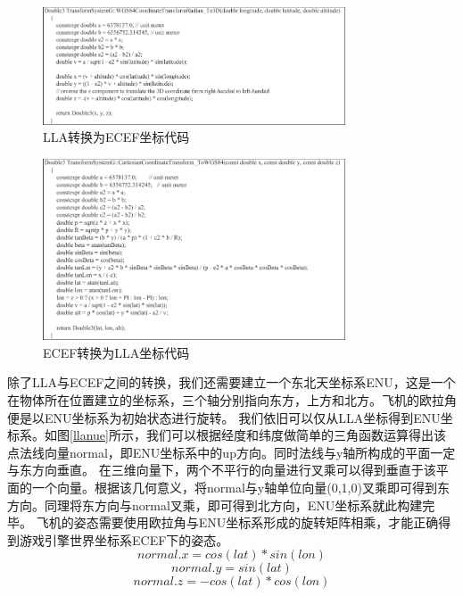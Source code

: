 \begin{figure}[h!]
    \begin{center}
        \includegraphics[width=0.8\textwidth]{pictures/code23.pdf}
        \caption{LLA转换为ECEF坐标代码}
        \label{lla2ecef}
    \end{center}
\end{figure}
\clearpage
\begin{figure}[h!]
    \begin{center}
        \includegraphics[width=0.8\textwidth]{pictures/code28.pdf}
        \caption{ECEF转换为LLA坐标代码}
        \label{ecef2lla}
    \end{center}
\end{figure}
\par 
除了LLA与ECEF之间的转换，我们还需要建立一个东北天坐标系ENU，这是一个在物体所在位置建立的坐标系，三个轴分别指向东方，上方和北方。飞机的欧拉角便是以ENU坐标系为初始状态进行旋转。
我们依旧可以仅从LLA坐标得到ENU坐标系。如图\ref{llanue}所示，我们可以根据经度和纬度做简单的三角函数运算得出该点法线向量normal，即ENU坐标系中的up方向。同时法线与y轴所构成的平面一定与东方向垂直。
在三维向量下，两个不平行的向量进行叉乘可以得到垂直于该平面的一个向量。根据该几何意义，将normal与y轴单位向量(0,1,0)叉乘即可得到东方向。同理将东方向与normal叉乘，即可得到北方向，ENU坐标系就此构建完毕。
飞机的姿态需要使用欧拉角与ENU坐标系形成的旋转矩阵相乘，才能正确得到游戏引擎世界坐标系ECEF下的姿态。
$$normal.x=cos(lat) * sin(lon)$$
$$normal.y = sin(lat)$$
$$normal.z = -cos(lat) * cos(lon)$$
